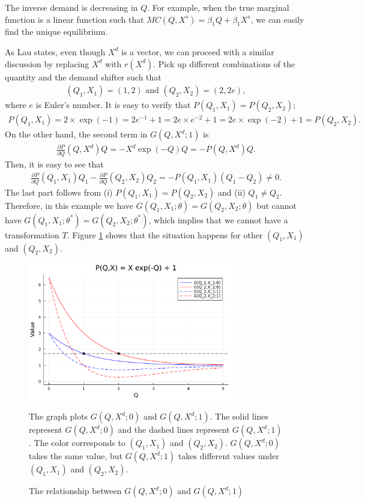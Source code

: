 \documentclass[11pt, a4paper]{article}
\theoremstyle{remark}
\begin{document}
The inverse demand is decreasing in $Q$.
For example, when the true marginal function is a linear function such that $MC(Q, X^{s}) = \beta_1 Q + \beta_1X^s$, we can easily find the unique equilibrium.


As Lau states, even though $X^{d}$ is a vector, we can proceed with a similar discussion by replacing $X^{d}$ with $r(X^{d})$.
Pick up different combinations of the quantity and the demand shifter such that 
\begin{align}
    (Q_1, X_1) = (1, 2) \text{ and } (Q_2, X_2) = (2, 2e),
\end{align}
where $e$ is Euler's number.
It is easy to verify that $P(Q_1, X_1) = P(Q_2, X_2)$;
\begin{align}
    P(Q_1, X_1) = 2 \times \exp(-1) = 2 e^{-1} + 1 = 2 e \times e^{-2} +1 = 2e \times \exp(-2)  +1=  P(Q_2, X_2).
\end{align}
On the other hand, the second term in $G(Q, X^{d};1)$ is
\begin{align}
    \frac{\partial P}{\partial Q}(Q, X^{d})Q = - X^{d} \exp(-Q) Q = - P(Q,X^{d})Q.
\end{align}
Then, it is easy to see that 
\begin{align}
    \frac{\partial P}{\partial Q}(Q_1, X_1)Q_1 - \frac{\partial P}{\partial Q}(Q_2, X_2)Q_2 = - P(Q_1,X_1)(Q_1 - Q_2) \ne 0.
\end{align}
The last part follows from (i) $P(Q_1, X_1) = P(Q_2, X_2)$ and (ii) $Q_1 \ne Q_2$.
Therefore, in this example we have $G(Q_1, X_1; \theta) = G(Q_2, X_2; \theta)$ but cannot have $G(Q_1, X_1; \theta^{*}) = G(Q_2, X_2; \theta^{*})$, which implies that we cannot have a transformation $T$.
Figure \ref{fig:counterxample_demand_curves} shows that the situation happens for other $(Q_1, X_1)$ and $(Q_2, X_2)$.

\begin{figure}[th]
\begin{center}
\includegraphics[width=0.8\textwidth]{../figuretable/plot_counter_example.pdf}
\caption{The relationship between $G(Q,X^{d};0)$ and $G(Q,X^{d};1)$}
\label{fig:counterxample_demand_curves}
\end{center}
The graph plots $G(Q,X^{d};0)$ and $G(Q,X^{d};1)$.
The solid lines represent $G(Q,X^{d};0)$ and the dashed lines represent $G(Q,X^{d};1)$.
The color corresponds to $(Q_1, X_1)$ and $(Q_2, X_2)$.
$G(Q,X^{d};0)$ takes the same value, but $G(Q,X^{d};1)$ takes different values under $(Q_1, X_1)$ and $(Q_2, X_2)$.
\end{figure}
\end{document}
